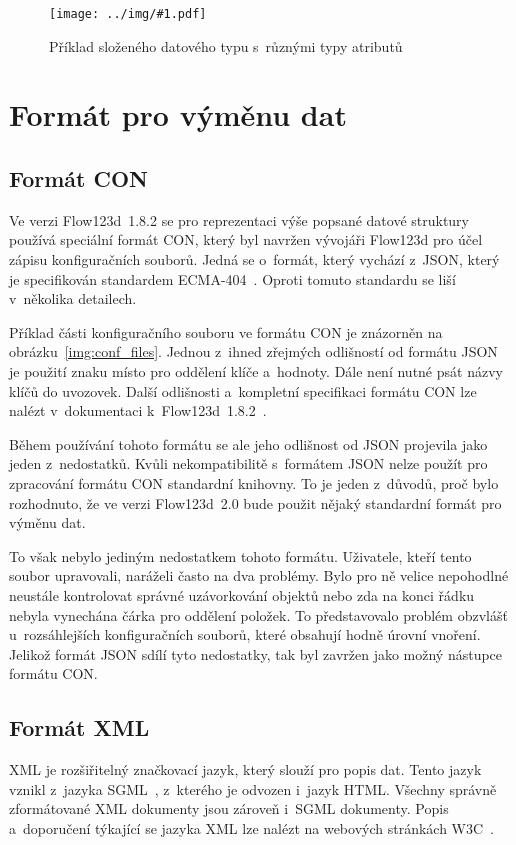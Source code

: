 \documentclass[FM,bw,DP]{tulthesis}
\newcommand{\includeimg}[2]{%
\begin{figure}[h]
	\centering
    \texttt{[image: ../img/\#1.pdf]}
    \caption{#2}
	\label{img:#1}
\end{figure}
}
\begin{document}
\includeimg{data_tree}{Příklad složeného datového typu s~různými typy atributů}

\section{Formát pro výměnu dat}

\subsection{Formát CON}

Ve verzi Flow123d~1.8.2 se pro reprezentaci výše popsané datové struktury používá speciální formát \gls{CON}, který byl navržen vývojáři Flow123d pro účel zápisu konfiguračních souborů. Jedná se o~formát, který vychází z~\gls{JSON}, který je specifikován standardem ECMA-404~\cite{bib:ecma404}. Oproti tomuto standardu se liší v~několika detailech.

Příklad části konfiguračního souboru ve formátu \gls{CON} je znázorněn na obrázku~\ref{img:conf_files}. Jednou z~ihned zřejmých odlišností od formátu \gls{JSON} je použití znaku \uv{\texttt{=}} místo \uv{\texttt{:}} pro oddělení klíče a~hodnoty. Dále není nutné psát názvy klíčů do uvozovek. Další odlišnosti a~kompletní specifikaci formátu \gls{CON} lze nalézt v~dokumentaci k~Flow123d~1.8.2~\cite{bib:flow123d-manual}.

Během používání tohoto formátu se ale jeho odlišnost od \gls{JSON} projevila jako jeden z~nedostatků. Kvůli nekompatibilitě s~formátem \gls{JSON} nelze použít pro zpracování formátu \gls{CON} standardní knihovny. To je jeden z~důvodů, proč bylo rozhodnuto, že ve verzi Flow123d~2.0 bude použit nějaký standardní formát pro výměnu dat.

To však nebylo jediným nedostatkem tohoto formátu. Uživatele, kteří tento soubor upravovali, naráželi často na dva problémy. Bylo pro ně velice nepohodlné neustále kontrolovat správné uzávorkování objektů nebo zda na konci řádku nebyla vynechána čárka pro oddělení položek. To představovalo problém  obzvlášť u~rozsáhlejších konfiguračních souborů, které obsahují hodně úrovní vnoření. Jelikož formát \gls{JSON} sdílí tyto nedostatky, tak byl zavržen jako možný nástupce formátu \gls{CON}.

\subsection{Formát XML}

\gls{XML} je rozšiřitelný značkovací jazyk, který slouží pro popis dat. Tento jazyk vznikl z~jazyka \gls{SGML}~\cite{bib:sgml-iso}, z~kterého je odvozen i~jazyk \gls{HTML}. Všechny správně zformátované \gls{XML} dokumenty jsou zároveň i~\gls{SGML} dokumenty. Popis a~doporučení týkající se jazyka \gls{XML} lze nalézt na webových stránkách \gls{W3C}~\cite{bib:xml}.
\end{document}
